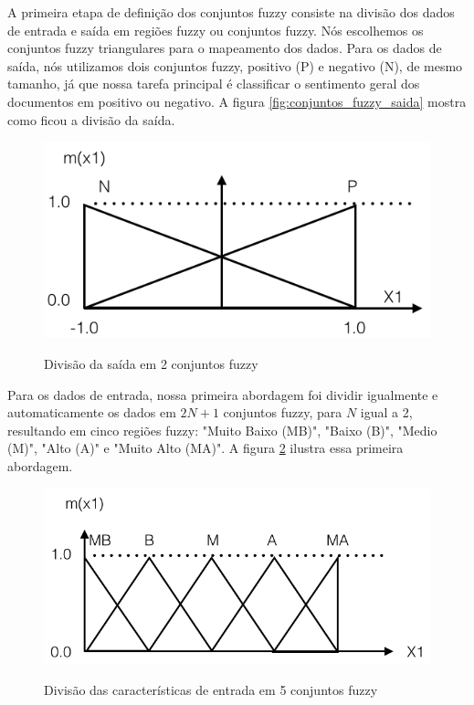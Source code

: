 A primeira etapa de definição dos conjuntos fuzzy consiste na divisão dos dados de entrada e saída em regiões fuzzy ou conjuntos fuzzy. Nós escolhemos os conjuntos fuzzy triangulares \cite{wang1992generating} para o mapeamento dos dados. Para os dados de saída, nós utilizamos dois conjuntos fuzzy, positivo (P) e negativo (N), de mesmo tamanho, já que nossa tarefa principal é classificar o sentimento geral dos documentos em positivo ou negativo. A figura \ref{fig:conjuntos_fuzzy_saida} mostra como ficou a divisão da saída. 

\begin{figure}[h]
\caption{Divisão da saída em 2 conjuntos fuzzy}
\centering
\includegraphics[scale=0.45]{conjuntos_fuzzy_saida.png}
\label{figura:conjuntos_fuzzy_saida}
\end{figure}

Para os dados de entrada, nossa primeira abordagem foi dividir igualmente e automaticamente os dados em $2N + 1$ \cite{wang1992generating} conjuntos fuzzy, para $N$ igual a 2, resultando em cinco regiões fuzzy: "Muito Baixo (MB)", "Baixo (B)", "Medio (M)", "Alto (A)" e "Muito Alto (MA)". A figura \ref{figura:cinco_conjuntos_fuzzy} ilustra essa primeira abordagem.

\begin{figure}[h]
\caption{Divisão das características de entrada em 5 conjuntos fuzzy}
\centering
\includegraphics[scale=0.45]{cinco_conjuntos_fuzzy.png}
\label{figura:cinco_conjuntos_fuzzy}
\end{figure}

